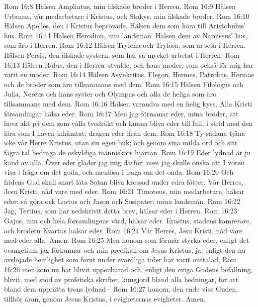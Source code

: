 Rom 16:8  Hälsen Ampliatus, min älskade broder i Herren.
Rom 16:9  Hälsen Urbanus, vår medarbetare i Kristus, och Stakys, min älskade broder.
Rom 16:10  Hälsen Apelles, den i Kristus beprövade. Hälsen dem som höra till Aristobulus' hus.
Rom 16:11  Hälsen Herodion, min landsman. Hälsen dem av Narcissus' hus, som äro i Herren.
Rom 16:12  Hälsen Tryfena och Tryfosa, som arbeta i Herren. Hälsen Persis, den älskade systern, som har så mycket arbetat i Herren.
Rom 16:13  Hälsen Rufus, den i Herren utvalde, och hans moder, som också för mig har varit en moder.
Rom 16:14  Hälsen Asynkritus, Flegon, Hermes, Patrobas, Hermas och de bröder som äro tillsammans med dem.
Rom 16:15  Hälsen Filologus och Julia, Nereus och hans syster och Olympas och alla de heliga som äro tillsammans med dem.
Rom 16:16  Hälsen varandra med en helig kyss. Alla Kristi församlingar hälsa eder.
Rom 16:17  Men jag förmanar eder, mina bröder, att hava akt på dem som vålla tvedräkt och kunna bliva eder till fall, i strid med den lära som I haven inhämtat; dragen eder ifrån dem.
Rom 16:18  Ty sådana tjäna icke vår Herre Kristus, utan sin egen buk; och genom sina milda ord och sitt fagra tal bedraga de oskyldiga människors hjärtan.
Rom 16:19  Eder lydnad är ju känd av alla. Över eder gläder jag mig därför; men jag skulle önska att I voren visa i fråga om det goda, och menlösa i fråga om det onda.
Rom 16:20  Och fridens Gud skall snart låta Satan bliva krossad under edra fötter. Vår Herres, Jesu Kristi, nåd vare med eder.
Rom 16:21  Timoteus, min medarbetare, hälsar eder: så göra ock Lucius och Jason och Sosipater, mina landsmän.
Rom 16:22  Jag, Tertius, som har nedskrivit detta brev, hälsar eder i Herren.
Rom 16:23  Gajus, min och hela församlingens värd, hälsar eder. Erastus, stadens kamrerare, och brodern Kvartus hälsar eder.
Rom 16:24  Vår Herres, Jesu Kristi, nåd vare med eder alla. Amen.
Rom 16:25  Men honom som förmår styrka eder, enligt det evangelium jag förkunnar och min predikan om Jesus Kristus, ja, enligt den nu avslöjade hemlighet som förut under evärdliga tider har varit outtalad,
Rom 16:26  men som nu har blivit uppenbarad och, enligt den eviga Gudens befallning, blivit, med stöd av profetiska skrifter, kungjord bland alla hedningar, för att bland dem upprätta trons lydnad -
Rom 16:27  honom, den ende vise Guden, tillhör äran, genom Jesus Kristus, i evigheternas evigheter. Amen.


